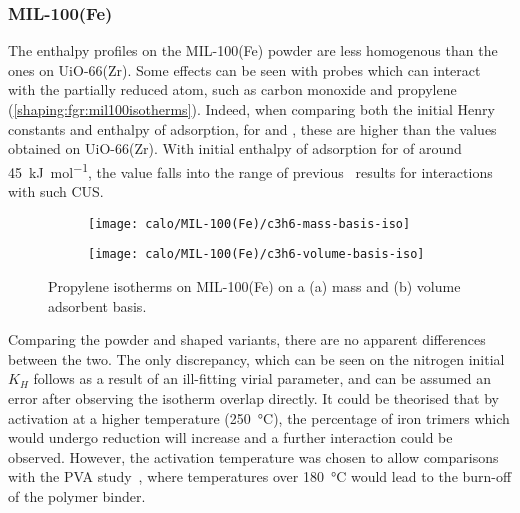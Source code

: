 
\subsubsection{MIL-100(Fe)}

The enthalpy profiles on the MIL-100(Fe) powder are less homogenous
than the ones on UiO-66(Zr). Some effects can be seen with probes which
can interact with the partially reduced  atom, such as
carbon monoxide and propylene (\autoref{shaping:fgr:mil100isotherms}).
Indeed, when comparing both the initial Henry constants and
enthalpy of adsorption, for  and , these are
higher than the values obtained on UiO-66(Zr).
With initial enthalpy of adsorption for  of around
\SI{45}{\kilo\joule\per\mol}, the value falls into the range of
previous~\cite{yoonControlledReducibilityMetalOrganic2010}
results for interactions with such  CUS.

\begin{figure}[htb]
	\centering
	\begin{subfigure}{0.45\textwidth}
		\texttt{[image: calo/MIL-100(Fe)/c3h6-mass-basis-iso]}
		\caption{}%
		\label{shaping:fgr:mil100c3h6adsmol}
	\end{subfigure}%
	\begin{subfigure}{0.45\textwidth}
		\texttt{[image: calo/MIL-100(Fe)/c3h6-volume-basis-iso]}
		\caption{}%
		\label{shaping:fgr:mil100c3h6adsvol}
	\end{subfigure}%
	\caption{Propylene isotherms on MIL-100(Fe) on a (a) mass
		and (b) volume adsorbent basis.}%
	\label{shaping:fgr:mil100isotherms}
\end{figure}

Comparing the powder and shaped variants, there are no
apparent differences between the two. The only discrepancy,
which can be seen on the nitrogen initial \(K_H\) follows
as a result of an ill-fitting virial parameter,
and can be assumed an error after observing the isotherm
overlap directly. It could be theorised that by activation at
a higher temperature (\SI{250}{\degreeCelsius}),
the percentage of iron trimers which would undergo reduction will
increase and a further interaction could be observed.
However, the activation temperature was chosen to allow
comparisons with the PVA study~\cite{chanutObservingEffectsShaping2016},
where temperatures over \SI{180}{\degreeCelsius} would lead to the
burn-off of the polymer binder.

